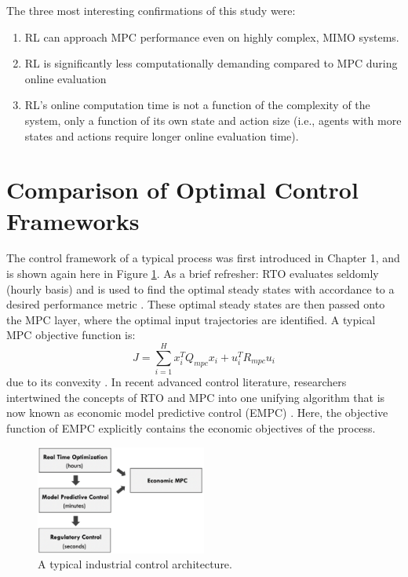 The three most interesting confirmations of this study were:
\begin{enumerate}
    \item RL can approach MPC performance even on highly complex, MIMO systems.
    \item RL is significantly less computationally demanding compared to MPC during online evaluation
    \item RL's online computation time is not a function of the complexity of the system, only a function of its own state and action size (i.e., agents with more states and actions require longer online evaluation time).
\end{enumerate}











\section{Comparison of Optimal Control Frameworks}
The control framework of a typical process was first introduced in Chapter 1, and is shown again here in Figure \ref{fig:rto_mpc_pid2}. As a brief refresher: RTO evaluates seldomly (hourly basis) and is used to find the optimal steady states with accordance to a desired performance metric \cite{rto}. These optimal steady states are then passed onto the MPC layer, where the optimal input trajectories are identified.  A typical MPC objective function is:
\begin{equation}
    J = \sum\limits_{i = 1}^{H}x_i^TQ_{mpc}x_i + u_i^TR_{mpc}u_i
    \label{eq:mpc}
\end{equation}
due to its convexity \cite{mpc}. In recent advanced control literature, researchers intertwined the concepts of RTO and MPC into one unifying algorithm that is now known as economic model predictive control (EMPC) \cite{empc1, empc2}. Here, the objective function of EMPC explicitly contains the economic objectives of the process.

\begin{figure}[H]
    \centering
    \includegraphics[width=0.5\textwidth]{images/ch1/rto_mpc_pid.jpeg}
    \caption{A typical industrial control architecture.}
    \label{fig:rto_mpc_pid2}
\end{figure}

